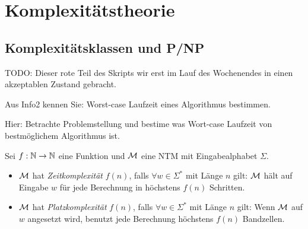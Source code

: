 \section[Komplexitätstheorie]{Komplexitätstheorie}
\subsection{Komplexitätsklassen und \ac{P}/\ac{NP}}

{\color{red} TODO: Dieser rote Teil des Skripts wir erst im Lauf des Wochenendes in einen akzeptablen Zustand gebracht.

Aus Info2 kennen Sie: Worst-case Laufzeit eines Algorithmus bestimmen.

Hier: Betrachte Problemstellung und bestime was Wort-case Laufzeit von bestmöglichem Algorithmus ist.

}


\begin{Def}
Sei $f:\mathbb{N}\rightarrow\mathbb{N}$ eine Funktion und $\mathcal{M}$ eine \ac{NTM} mit Eingabealphabet $\Sigma$.
\begin{itemize}
 \item $\mathcal{M}$ hat \emph{Zeitkomplexität} $f(n)$, falls $\forall w\in\Sigma^*$ mit Länge $n$ gilt: $\mathcal{M}$ hält auf Eingabe $w$ für jede Berechnung in höchstens $f(n)$ Schritten.
 \item $\mathcal{M}$ hat \emph{Platzkomplexität} $f(n)$, falls $\forall w\in\Sigma^*$ mit Länge $n$ gilt: Wenn $\mathcal{M}$ auf $w$ angesetzt wird, benutzt jede Berechnung höchstens $f(n)$ Bandzellen.
 \qedhere
\end{itemize}
\end{Def}


